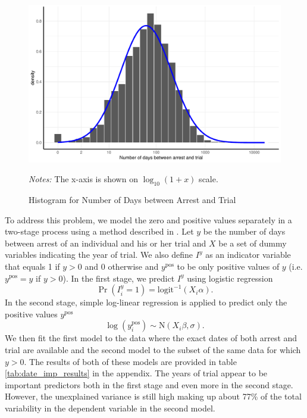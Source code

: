  \begin{figure}[h]
\centering
\caption{Histogram for Number of Days between Arrest and Trial}
\includegraphics[width=\textwidth]{plots/imputing_arrest_date/simple_lm_hist.pdf}
\label{fig:simple_lm_hist}
\begin{minipage}{0.92\textwidth}
\footnotesize
\emph{Notes:} The x-axis is shown on  $\log_{10}(1 + x)$ scale.
\end{minipage}

\end{figure}

To address this problem, we model the zero and positive values separately in a two-stage process 
using a method described in \citet[p. 537-538]{gelman_data_2006}. 
Let $y$ be the number of days between arrest of an individual and his or her trial and $X$ be a set of dummy variables indicating the year of trial. We also define $I^y$ as an indicator variable that equals 1 if $y > 0$ and 0 otherwise and  $y^{\text{pos}}$ to be only positive values of $y$ (i.e. $y^{\text{pos}} = y$ if   $y > 0$).  In the first stage, we predict $I^y$  using logistic regression
\begin{equation}
\Pr\left( I_i^y = 1 \right)  = \text{logit}^{-1} \left(X_i \alpha \right).
\end{equation}
In the second stage, simple log-linear regression is applied to predict only the positive values $y^{\text{pos}}$
\begin{equation}
\log\left(y_i^{\text{pos}}\right) \sim \text{N} \left(X_i \beta, \sigma \right).
\end{equation}
We then fit the first model to the data where the exact dates of both arrest and trial are available and the second model to the subset of the same  data for which $y > 0$.
The results of both of these models are provided in table \ref{tab:date_imp_results} in the appendix. The years of trial appear to be important predictors both in the first stage and even more in the second stage. 
However, the unexplained variance is still high making up about 77\% of the total variability in the dependent variable in the second model. 


